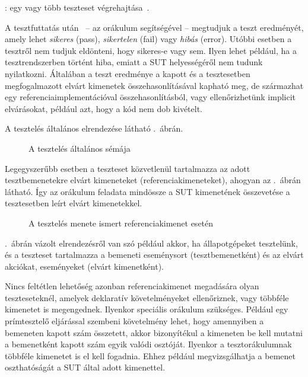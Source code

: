 \begin{definicio}
: egy vagy több teszteset végrehajtása~\cite{IEEE-24765}.
\end{definicio}

A tesztfuttatás után~\cite{IEEE-24765} -- az orákulum segítségével -- megtudjuk a teszt eredményét, amely lehet \emph{sikeres} (pass), \emph{sikertelen} (fail) vagy \emph{hibás} (error). Utóbbi esetben a tesztről nem tudjuk eldönteni, hogy sikeres-e vagy sem. Ilyen lehet például, ha a tesztrendszerben történt hiba, emiatt a SUT helyességéről nem tudunk nyilatkozni.
Általában a teszt eredménye a kapott és a tesztesetben megfogalmazott elvárt kimenetek összehasonlításával kapható meg, de származhat egy referenciaimplementációval összehasonlításból, vagy ellenőrizhetünk implicit elvárásokat, például azt, hogy a kód nem dob kivételt.

A tesztelés általános elrendezése látható .~ábrán.

\begin{figure}[h]
	\centering
	

	\caption{A tesztelés általános sémája}
	\label{fig:teszteles-elrendezes-orakulum}
\end{figure}

Legegyszerűbb esetben a teszteset közvetlenül tartalmazza az adott tesztbemenetekre elvárt kimeneteket (referenciakimeneteket), ahogyan az .~ábrán látható. Így az orákulum feladata mindössze a SUT kimenetének összevetése a tesztesetben leírt elvárt kimenetekkel.

\begin{figure}[h]
	\centering
	

	\caption{A tesztelés menete ismert referenciakimenet esetén}
	\label{fig:teszteles-elrendezes-elvart-kimenet}
\end{figure}

.~ábrán vázolt elrendezésről van szó például akkor, ha állapotgépeket tesztelünk, és a teszteset tartalmazza a bemeneti eseménysort (tesztbemenetként) és az elvárt akciókat, eseményeket (elvárt kimenetként).

Nincs feltétlen lehetőség azonban referenciakimenet megadására olyan teszteseteknél, amelyek deklaratív követelményeket ellenőriznek, vagy többféle kimenetet is megengednek. Ilyenkor speciális orákulum szükséges. Például egy prímtesztelő eljárással szembeni követelmény lehet, hogy amennyiben a bemeneten kapott szám összetett, akkor bizonyítékul a kimeneten be kell mutatni a bemenetként kapott szám egyik valódi osztóját. Ilyenkor a tesztorákulumnak többféle kimenetet is el kell fogadnia. Ehhez például megvizsgálhatja a bemenet oszthatóságát a SUT által adott kimenettel.

